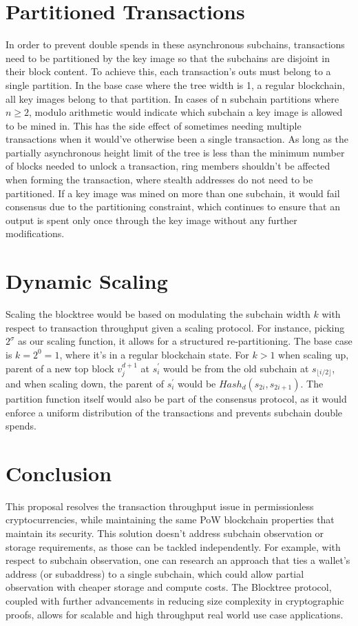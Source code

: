 \documentclass{article}
\begin{document}
\section{Partitioned Transactions}
In order to prevent double spends in these asynchronous subchains, transactions need to be partitioned by the key image so that the subchains are disjoint in their block content. To achieve this, each transaction's outs must belong to a single partition. In the base case where the tree width is 1, a regular blockchain, all key images belong to that partition. In cases of n subchain partitions where $n \geq 2$, modulo arithmetic would indicate which subchain a key image is allowed to be mined in. This has the side effect of sometimes needing multiple transactions when it would've otherwise been a single transaction. As long as the partially asynchronous height limit of the tree is less than the minimum number of blocks needed to unlock a transaction, ring members shouldn't be affected when forming the transaction, where stealth addresses do not need to be partitioned. If a key image was mined on more than one subchain, it would fail consensus due to the partitioning constraint, which continues to ensure that an output is spent only once through the key image without any further modifications.
\section{Dynamic Scaling}
Scaling the blocktree would be based on modulating the subchain width $k$ with respect to transaction throughput given a scaling protocol. For instance, picking $2^\sigma$ as our scaling function, it allows for a structured re-partitioning. The base case is $k = 2^0 = 1$, where it's in a regular blockchain state. For $k > 1$ when scaling up, parent of a new top block $v_j^{d+1}$ at $s_i^\prime$ would be from the old subchain at $s_{\lfloor i / 2\rfloor}$, and when scaling down, the parent of $s_i^\prime$ would be $Hash_d(s_{2i}, s_{2i + 1})$. The partition function itself would also be part of the consensus protocol, as it would enforce a uniform distribution of the transactions and prevents subchain double spends.
\section{Conclusion}
This proposal resolves the transaction throughput issue in permissionless cryptocurrencies, while maintaining the same PoW blockchain properties that maintain its security. This solution doesn't address subchain observation or storage requirements, as those can be tackled independently. For example, with respect to subchain observation, one can research an approach that ties a wallet's address (or subaddress) to a single subchain, which could allow partial observation with cheaper storage and compute costs. The Blocktree protocol, coupled with further advancements in reducing size complexity in cryptographic proofs, allows for scalable and high throughput real world use case applications.
\end{document}
